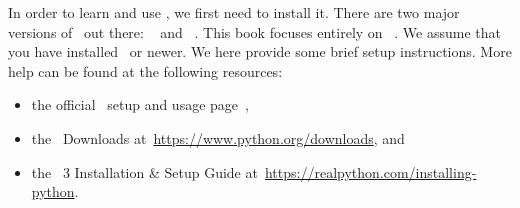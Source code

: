 %
\label{sec:installingPython}%
In order to learn and use \python, we first need to install it.
There are two major versions of \python\ out there: \python~ and \python~.
This book focuses entirely on \python~.
We assume that you have installed \pythonWithVersion\ or newer.
We here provide some brief setup instructions.
More help can be found at the following resources:%
%
\begin{itemize}%
\item the official \python\ setup and usage page~,%
\item the \python\ Downloads at~\url{https://www.python.org/downloads}, and%
\item the \python~3 Installation \& Setup Guide at~\url{https://realpython.com/installing-python}.%
\end{itemize}%
%
%
%
%
\endhsection%
%
